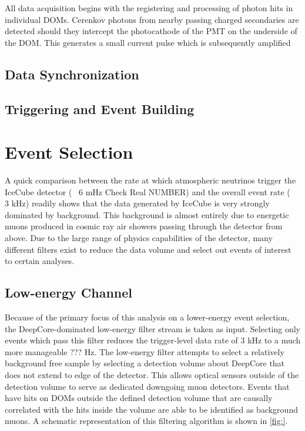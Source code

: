 \documentclass{gatech-thesis}
\begin{document}
All data acquisition begins with the registering and processing of photon hits in individual DOMs. Cerenkov photons from nearby passing charged secondaries are detected should they intercept the photocathode of the PMT on the underside of the DOM. This generates a small current pulse which is subsequently amplified 

\section{Data Synchronization}

\section{Triggering and Event Building}


\chapter{Event Selection}
A quick comparison between the rate at which atmospheric neutrinos trigger the IceCube detector (~ 6 mHz Check Real NUMBER) and the overall event rate (~ 3 kHz) readily shows that the data generated by IceCube is very strongly dominated by background. This background is almost entirely due to energetic muons produced in cosmic ray air showers passing through the detector from above. Due to the large range of physics capabilities of the detector, many different filters exist to reduce the data volume and select out events of interest to certain analyses.

\section{Low-energy Channel}

Because of the primary focus of this analysis on a lower-energy event selection, the DeepCore-dominated low-energy filter stream is taken as input. Selecting only events which pass this filter reduces the trigger-level data rate of 3 kHz to a much more manageable  ??? Hz. The low-energy filter attempts to select a relatively background free sample by selecting a detection volume about DeepCore that does not extend to edge of the detector. This allows optical sensors outside of the detection volume to serve as dedicated downgoing muon detectors. Events that have hits on DOMs outside the defined detection volume that are causally correlated with the hits inside the volume are able to be identified as background muons. A schematic representation of this filtering algorithm is shown in \ref{fig:}. 
\end{document}
